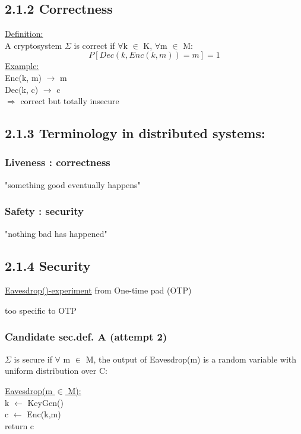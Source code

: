 \documentclass{report}
\begin{document}
 \subsection*{2.1.2 Correctness}
 \underline{Definition:} \\
 A cryptosystem $\Sigma$ is correct if $\forall$k $\in$ K, $\forall$m $\in$ M:
 \[
 	P[Dec(k,Enc(k,m))=m]=1
 \]
 \underline{Example:} \\
 Enc(k, m) $\rightarrow$ m \\
 Dec(k, c) $\rightarrow$ c \\
 $\Rightarrow$ correct but totally insecure
 \subsection*{2.1.3 Terminology in distributed systems:}
 \subsubsection*{Liveness : correctness}
 "something good eventually happens"
 \subsubsection*{Safety : security}
 "nothing bad has happened"
 \subsection*{2.1.4 Security}
 \underline{Eavesdrop()-experiment} from One-time pad (OTP)
 \begin{compactenum}[-]
 	\item too specific to OTP
 \end{compactenum}
 \subsubsection*{Candidate sec.def. A (attempt 2)}
 $\Sigma$ is secure if $\forall$ m $\in$ M, the output of Eavesdrop(m) is a random variable with uniform distribution over C:
 \begin{center}
 	\underline{Eavesdrop(m $\in$ M):} \\
 	k $\leftarrow$ KeyGen() \\
 	c $\leftarrow$ Enc(k,m) \\
 	return c
 \end{center}
\end{document}
